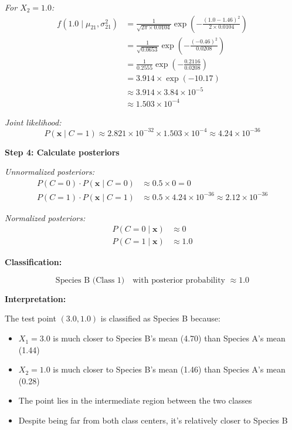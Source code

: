 \documentclass[12pt]{article}
\begin{document}
\begin{solution}
\textit{For $X_2 = 1.0$:}
\begin{align}
f(1.0 \mid \mu_{21}, \sigma_{21}^2) &= \frac{1}{\sqrt{2\pi \times 0.0104}} \exp\left(-\frac{(1.0-1.46)^2}{2 \times 0.0104}\right) \\
&= \frac{1}{\sqrt{0.0653}} \exp\left(-\frac{(-0.46)^2}{0.0208}\right) \\
&= \frac{1}{0.2555} \exp\left(-\frac{0.2116}{0.0208}\right) \\
&= 3.914 \times \exp(-10.17) \\
&\approx 3.914 \times 3.84 \times 10^{-5} \\
&\approx 1.503 \times 10^{-4}
\end{align}

\textit{Joint likelihood:}
\[
P(\mathbf{x} \mid C=1) \approx 2.821 \times 10^{-32} \times 1.503 \times 10^{-4} \approx 4.24 \times 10^{-36}
\]

\textbf{Step 4: Calculate posteriors}

\textit{Unnormalized posteriors:}
\begin{align}
P(C=0) \cdot P(\mathbf{x} \mid C=0) &\approx 0.5 \times 0 = 0 \\
P(C=1) \cdot P(\mathbf{x} \mid C=1) &\approx 0.5 \times 4.24 \times 10^{-36} \approx 2.12 \times 10^{-36}
\end{align}

\textit{Normalized posteriors:}
\begin{align}
P(C=0 \mid \mathbf{x}) &\approx 0 \\
P(C=1 \mid \mathbf{x}) &\approx 1.0
\end{align}

\textbf{Classification:}

\[
\boxed{\text{Species B (Class 1)} \quad \text{with posterior probability } \approx 1.0}
\]

\textbf{Interpretation:}

The test point $(3.0, 1.0)$ is classified as Species B because:
\begin{itemize}
    \item $X_1 = 3.0$ is much closer to Species B's mean (4.70) than Species A's mean (1.44)
    \item $X_2 = 1.0$ is much closer to Species B's mean (1.46) than Species A's mean (0.28)
    \item The point lies in the intermediate region between the two classes
    \item Despite being far from both class centers, it's relatively closer to Species B
\end{itemize}
\end{solution}
\end{document}
